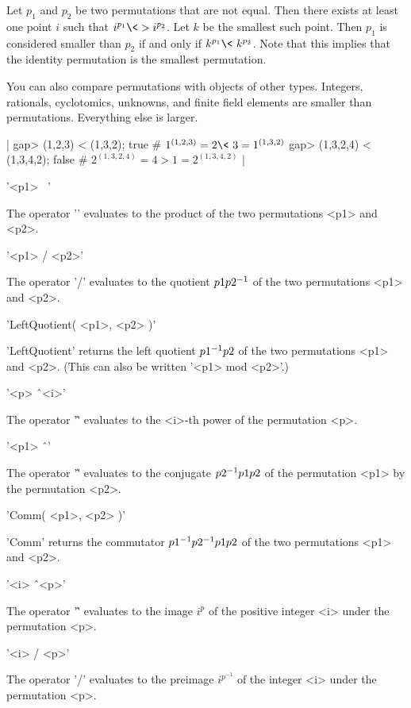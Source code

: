 Let $p_1$ and $p_2$ be two  permutations that are  not equal.  Then there
exists  at least one point  $i$ such that $i^{p_1} \<> i^{p_2}$.  Let $k$
be the  smallest such point.  Then $p_1$ is considered smaller than $p_2$
if  and only  if $k^{p_1} \<\ k^{p_2}$.   Note that this implies that the
identity permutation is the smallest permutation.

You can also compare permutations with objects of other types.  Integers,
rationals, cyclotomics, unknowns, and  finite field  elements are smaller
than permutations.  Everything else is larger.

|    gap> (1,2,3) < (1,3,2);
    true    # $1^{(1,2,3)} = 2 \<\ 3 = 1^{(1,3,2)}$
    gap> (1,3,2,4) < (1,3,4,2);
    false    # $2^{(1,3,2,4)} = 4 > 1 = 2^{(1,3,4,2)}$ |

%

'<p1> \*\ <p2>'

The operator '\*'  evaluates to the product of the two  permutations <p1>
and <p2>.

'<p1> / <p2>'

The operator  '/'  evaluates to the quotient $p1 \*  p2^{-1}$  of the two
permutations <p1> and <p2>.

'LeftQuotient( <p1>, <p2> )'

'LeftQuotient' returns  the left  quotient  $p1^{-1}  \* p2$ of  the  two
permutations <p1> and <p2>.  (This can also be written '<p1> mod <p2>'.)

'<p> \^\ <i>'

The operator '\^' evaluates to the <i>-th power of the permutation <p>.

'<p1> \^\ <p2>'

The operator '\^' evaluates to the conjugate $p2^{-1} \* p1 \* p2$ of the
permutation <p1> by the permutation <p2>.

'Comm( <p1>, <p2> )'

'Comm' returns the commutator $p1^{-1} \* p2^{-1} \* p1 \* p2$ of the two
permutations <p1> and <p2>.

'<i> \^\ <p>'

The operator '\^' evaluates to  the image $i^p$  of the  positive integer
<i> under the permutation <p>.

'<i> / <p>'

The operator  '/' evaluates to  the preimage  $i^{p^{-1}}$ of the integer
<i> under the permutation <p>.


